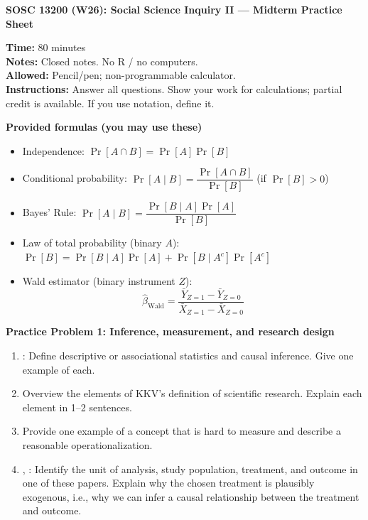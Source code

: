 \documentclass[12pt]{article}
\begin{document}
\begin{center}
\textbf{SOSC 13200 (W26): Social Science Inquiry II --- Midterm Practice Sheet}
\end{center}

\noindent\textbf{Time:} 80 minutes \\
\textbf{Notes:} Closed notes. No R / no computers. \\
\textbf{Allowed:} Pencil/pen; non-programmable calculator. \\
\textbf{Instructions:} Answer all questions. Show your work for calculations; partial credit is available. If you use notation, define it.

\vspace{0.5em}
\noindent\textbf{Provided formulas (you may use these)}
\begin{itemize}
  \item Independence: $\Pr[A \cap B]=\Pr[A]\Pr[B]$
  \item Conditional probability: $\Pr[A\mid B]=\dfrac{\Pr[A\cap B]}{\Pr[B]}$ (if $\Pr[B]>0$)
  \item Bayes' Rule: $\Pr[A\mid B]=\dfrac{\Pr[B\mid A]\Pr[A]}{\Pr[B]}$
  \item Law of total probability (binary $A$): $\Pr[B]=\Pr[B\mid A]\Pr[A]+\Pr[B\mid A^c]\Pr[A^c]$
  \item Wald estimator (binary instrument $Z$):
  \[
  \hat\beta_{\text{Wald}}=\frac{\bar Y_{Z=1}-\bar Y_{Z=0}}{\bar X_{Z=1}-\bar X_{Z=0}}
  \]
\end{itemize}

\vspace{0.5em}
\noindent\textbf{Practice Problem 1: Inference, measurement, and research design}
\begin{enumerate}[label=\arabic*.]
  \item \cite{holland1986statistics}: Define descriptive or associational statistics and causal inference. Give one example of each.
  \item \cite{king1994designing} Overview the elements of KKV's definition of scientific research. Explain each element in 1--2 sentences. 
  \item \cite{adcockcollier2001measurement} Provide one example of a concept that is hard to measure and describe a reasonable operationalization.
  \item \cite{angrist1991does}, \cite{cardkrueger1994minimum}: Identify the unit of analysis, study population, treatment, and outcome in one of these papers. Explain why the chosen treatment is plausibly exogenous, i.e., why we can infer a causal relationship between the treatment and outcome.
\end{enumerate}
\end{document}
